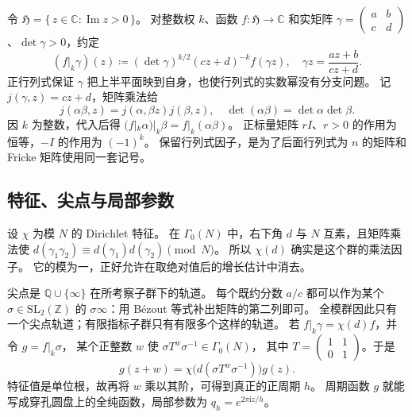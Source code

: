 \ProseParagraphBreak

令 \(\mathfrak H=\{\,z\in\mathbb C:\operatorname{Im}z>0\,\}\)。
对整数权 \(k\)、函数 \(f:\mathfrak H\rightarrow\mathbb C\) 和实矩阵
\(\gamma=\left(\begin{smallmatrix}a&b\\c&d\end{smallmatrix}\right)\)、\(\det\gamma>0\)，约定
\[
 (f|_k\gamma)(z)\coloneqq
       (\det\gamma)^{k/2}(cz+d)^{-k}f(\gamma z),
 \quad \gamma z=\frac{az+b}{cz+d}.
\]
正行列式保证 \(\gamma\) 把上半平面映到自身，也使行列式的实数幂没有分支问题。
记 \(j(\gamma,z)=cz+d\)，矩阵乘法给
\[
 j(\alpha\beta,z)=j(\alpha,\beta z)j(\beta,z),\quad
 \det(\alpha\beta)=\det\alpha\det\beta.
\]
因 \(k\) 为整数，代入后得
\((f|_k\alpha)|_k\beta=f|_k(\alpha\beta)\)。
正标量矩阵 \(rI\)、\(r>0\) 的作用为恒等，\(-I\) 的作用为 \((-1)^k\)。
保留行列式因子，是为了后面行列式为 \(n\) 的矩阵和 Fricke 矩阵使用同一套记号。

\subsection{特征、尖点与局部参数}
\label{b3:subsec:E0102}

设 \(\chi\) 为模 \(N\) 的 Dirichlet 特征。
在 \(\Gamma_0(N)\) 中，右下角 \(d\) 与 \(N\) 互素，且矩阵乘法使
\(d(\gamma_1\gamma_2)\equiv d(\gamma_1)d(\gamma_2)\pmod N\)。
所以 \(\chi(d)\) 确实是这个群的乘法因子。
它的模为一，正好允许在取绝对值后的增长估计中消去。

\ProseParagraphBreak

尖点是 \(\mathbb Q\cup\{\infty\}\) 在所考察子群下的轨道。
每个既约分数 \(a/c\) 都可以作为某个 \(\sigma\in\mathrm{SL}_2(\mathbb Z)\)
的 \(\sigma\infty\)：用 Bézout 等式补出矩阵的第二列即可。
全模群因此只有一个尖点轨道；有限指标子群只有有限多个这样的轨道。
若 \(f|_k\gamma=\chi(d)f\)，并令 \(g=f|_k\sigma\)，
某个正整数 \(w\) 使 \(\sigma T^w\sigma^{-1}\in\Gamma_0(N)\)，
其中 \(T=\left(\begin{smallmatrix}1&1\\0&1\end{smallmatrix}\right)\)。于是
\[
 g(z+w)=\chi\bigl(d(\sigma T^w\sigma^{-1})\bigr)g(z).
\]
特征值是单位根，故再将 \(w\) 乘以其阶，可得到真正的正周期 \(h\)。
周期函数 \(g\) 就能写成穿孔圆盘上的全纯函数，局部参数为
\(q_h=e^{2\pi\mathrm i z/h}\)。

